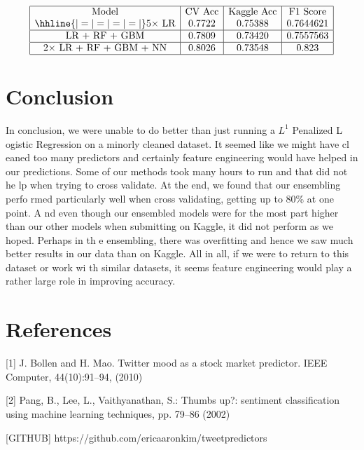 \documentclass{article}
\begin{document}
$$\begin{array}{|c|c|c|c|}
\hline
\text{Model} & \text{CV Acc} & \text{Kaggle Acc} & \text{F1 Score} \\
\hhline{|=|=|=|=|}
\text{5$\times$ LR} & 0.7722 & 0.75388 & 0.7644621 \\
\hline
\text{LR + RF + GBM} & 0.7809 & 0.73420 & 0.7557563 \\
\hline
\text{$2\times$ LR + RF + GBM + NN} & 0.8026 & 0.73548 & 0.823 \\
\hline
\end{array}$$


\section{Conclusion}
In conclusion, we were unable to do better than just running a $L^1$ Penalized L
ogistic Regression on a minorly cleaned dataset. It seemed like we might have cl
eaned too many predictors and certainly feature engineering would have helped in
 our predictions. Some of our methods took many hours to run and that did not he
lp when trying to cross validate. At the end, we found that our ensembling perfo
rmed particularly well when cross validating, getting up to 80\% at one point. A
nd even though our ensembled models were for the most part higher than our other
 models when submitting on Kaggle, it did not perform as we hoped. Perhaps in th
e ensembling, there was overfitting and hence we saw much better results in our
data than on Kaggle. All in all, if we were to return to this dataset or work wi
th similar datasets, it seems feature engineering would play a rather large role
 in improving accuracy.

\section{References}
[1] J. Bollen and H. Mao. Twitter mood as a stock market predictor. IEEE Computer, 44(10):91–94, (2010)

[2] Pang, B., Lee, L., Vaithyanathan, S.: Thumbs up?: sentiment classification using machine
learning techniques, pp. 79–86 (2002)

[GITHUB] https://github.com/ericaaronkim/tweetpredictors
\end{document}
